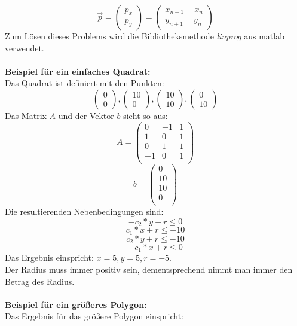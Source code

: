 \documentclass[conference]{IEEEtran}
\begin{document}
	\[ \vec{p} =  \left(\begin{array}{c}p_x\\p_y\end{array}\right) = \left(\begin{array}{c}x_{n+1} - x_n\\y_{n+1} - y_n\end{array}\right) \]
	Zum Lösen dieses Problems wird die Bibliotheksmethode \textit{linprog} aus matlab verwendet.\\
	\\
	\textbf{Beispiel für ein einfaches Quadrat:}\\
	Das Quadrat ist definiert mit den Punkten:
	\[\left(\begin{array}{c}0\\0\end{array}\right) , \left(\begin{array}{c}10\\0\end{array}\right),\left(\begin{array}{c}10\\10\end{array}\right),\left(\begin{array}{c}0\\10\end{array}\right)\]
	Das Matrix $A$ und der Vektor $b$ sieht so aus:
	\[A = \begin{pmatrix}
		0 & -1 & 1 \\
		1 & 0 & 1 \\
		0 & 1 & 1 \\
		-1 & 0 & 1 \\
	\end{pmatrix}\]
	\[b = \begin{pmatrix}
		0 \\
		10\\
		10\\
		0\\
	\end{pmatrix}\]
	Die resultierenden Nebenbedingungen sind:
	\[ -c_2*y+r \leq 0 \]
	\[ c_1*x+r \leq -10 \]
	\[ c_2*y+r \leq -10 \]
	\[ -c_1*x+r \leq 0 \]
	 Das Ergebnis einspricht: $x = 5, y = 5, r = -5$.\\
	 Der Radius muss immer positiv sein, dementsprechend nimmt man immer den Betrag des Radius.\\
	\\
	\textbf{Beispiel für ein größeres Polygon:}\\
	Das Ergebnis für das größere Polygon einspricht:\\
\end{document}
